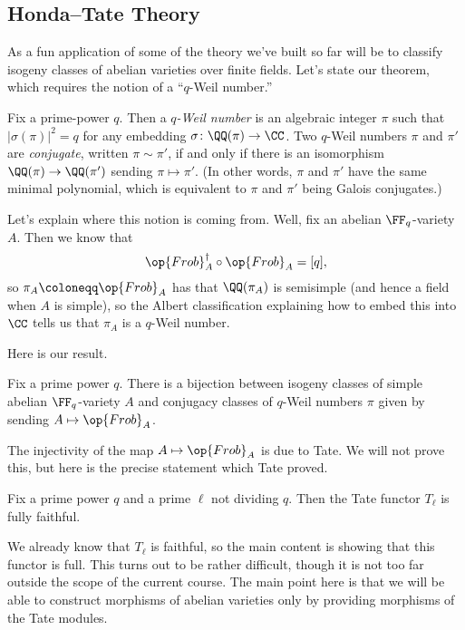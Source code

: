 \documentclass[../notes.tex]{subfiles}
\begin{document}
\subsection{Honda--Tate Theory}
As a fun application of some of the theory we've built so far will be to classify isogeny classes of abelian varieties over finite fields. Let's state our theorem, which requires the notion of a ``$q$-Weil number.''
\begin{definition}
	Fix a prime-power $q$. Then a \textit{$q$-Weil number} is an algebraic integer $\pi$ such that $\left|\sigma(\pi)\right|^2=q$ for any embedding $\sigma\colon\QQ(\pi)\to\CC$. Two $q$-Weil numbers $\pi$ and $\pi'$ are \textit{conjugate}, written $\pi\sim\pi'$, if and only if there is an isomorphism $\QQ(\pi)\to\QQ(\pi')$ sending $\pi\mapsto\pi'$. (In other words, $\pi$ and $\pi'$ have the same minimal polynomial, which is equivalent to $\pi$ and $\pi'$ being Galois conjugates.)
\end{definition}
\begin{remark}
	Let's explain where this notion is coming from. Well, fix an abelian $\FF_q$-variety $A$. Then we know that
	\[{\op{Frob}_A^\dagger}\circ{\op{Frob}_A}=[q],\]
	so $\pi_A\coloneqq\op{Frob}_A$ has that $\QQ(\pi_A)$ is semisimple (and hence a field when $A$ is simple), so the Albert classification explaining how to embed this into $\CC$ tells us that $\pi_A$ is a $q$-Weil number.
\end{remark}
Here is our result.
\begin{theorem} \label{thm:ht}
	Fix a prime power $q$. There is a bijection between isogeny classes of simple abelian $\FF_q$-variety $A$ and conjugacy classes of $q$-Weil numbers $\pi$ given by sending $A\mapsto\op{Frob}_A$.
\end{theorem}
The injectivity of the map $A\mapsto\op{Frob}_A$ is due to Tate. We will not prove this, but here is the precise statement which Tate proved.
\begin{theorem}[Tate] \label{thm:tate}
	Fix a prime power $q$ and a prime $\ell$ not dividing $q$. Then the Tate functor $T_\ell$ is fully faithful.
\end{theorem}
We already know that $T_\ell$ is faithful, so the main content is showing that this functor is full. This turns out to be rather difficult, though it is not too far outside the scope of the current course. The main point here is that we will be able to construct morphisms of abelian varieties only by providing morphisms of the Tate modules.
\end{document}
